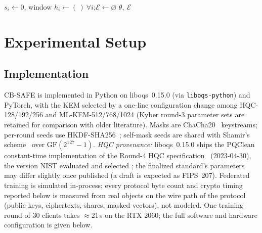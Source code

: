 \documentclass[lettersize,journal]{IEEEtran}
\begin{document}
\begin{algorithm}[t]
\caption{CB-SAFE+: Temporal Group Testing over Cluster Sums}
\label{alg:cbsafeplus}
\DontPrintSemicolon
{}
$s_i \leftarrow 0$, window $h_i \leftarrow (\,)\ \forall i$;\quad $\mathcal{E}\leftarrow\varnothing$\;
\Return $\theta,\ \mathcal{E}$\;
\end{algorithm}

\section{Experimental Setup}\label{sec:eval}
\subsection{Implementation}
CB-SAFE is implemented in Python on liboqs~0.15.0 (via \texttt{liboqs-python}) and
PyTorch, with the KEM selected by a one-line configuration change among HQC-128/192/256
and ML-KEM-512/768/1024 (Kyber round-3 parameter sets are retained for comparison
with older literature). Masks are ChaCha20~\cite{chacha20} keystreams; per-round seeds use
HKDF-SHA256~\cite{hkdf}; self-mask seeds are shared with Shamir's scheme~\cite{shamir1979} over
$\mathrm{GF}(2^{127}-1)$. \emph{HQC provenance:} liboqs~0.15.0 ships the PQClean
constant-time implementation of the Round-4 HQC specification~\cite{hqc} (2023-04-30), the
version NIST evaluated and selected \cite{nistir8545}; the finalized standard's
parameters may differ slightly once published (a draft is expected as FIPS~207).
Federated training is simulated in-process; every protocol byte count and crypto
timing reported below is measured from real objects on the wire path of the
protocol (public keys, ciphertexts, shares, masked vectors), not modeled.
One training round of 30 clients takes $\approx$21\,s on the RTX 2060; the full
software and hardware configuration is given below.
\end{document}
